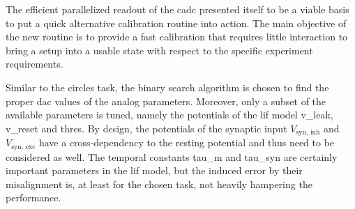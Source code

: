 The efficient parallelized readout of the \gls{cadc} presented itself to be a viable basis to put a quick alternative calibration routine into action. The main objective of the new routine is to provide a fast calibration that requires little interaction to bring a setup into a usable state with respect to the specific experiment requirements. 

Similar to the circles task, the binary search algorithm is chosen to find the proper \gls{dac} values of the analog parameters. Moreover, only a subset of the available parameters is tuned, namely the potentials of the \gls{lif} model \gls{v_leak}, \gls{v_reset} and \gls{thres}. By design, the potentials of the synaptic input $V_\text{syn, inh}$ and $V_\text{syn, exc}$ have a cross-dependency to the resting potential and thus need to be considered as well. The temporal constants \gls{tau_m} and \gls{tau_syn} are certainly important parameters in the \gls{lif} model, but the induced error by their misalignment is, at least for the chosen task, not heavily hampering the performance.

